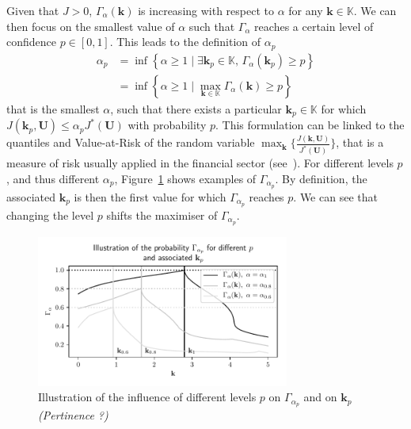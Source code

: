 \documentclass[preprint, 1p]{elsarticle}
\newcommand{\Prob}{\mathbb{P}}
\newcommand{\checkap}{{\alpha}_p}
\newcommand{\checkkp}{{\mathbf{k}}_p}
\newcommand{\Kspace}{\mathbb{K}}
\newcommand{\Uspace}{\mathbb{U}}
\newcommand{\victor}[1]{{\itshape\color{green} ({#1})}}
\begin{document}
Given that $J>0$, $\Gamma_{\alpha}(\mathbf{k})$ is increasing with respect to $\alpha$ for any $\mathbf{k}\in\Kspace$. We can then focus on the smallest value of $\alpha$ such that $\Gamma_\alpha$ reaches a certain level of confidence $p\in[0,1]$. This leads to the definition of $\checkap$
\begin{align}
  \checkap &= \inf\left\{ \alpha\geq 1 \mid \exists \checkkp \in \Kspace,\, \Gamma_{\alpha}(\checkkp) \geq p \right\} \nonumber \\
   &= \inf \left\{ \alpha \geq 1 \mid \max_{\mathbf{k}\in\Kspace} \Gamma_{\alpha}(\mathbf{k}) \geq p \right\}   \label{eq:def_alpha_check}
\end{align}
that is the smallest $\alpha$, such that there exists a particular $\checkkp \in \Kspace$ for which $J(\checkkp,\mathbf{U}) \leq \checkap J^*(\mathbf{U})$ with probability $p$. This formulation can be linked to the quantiles and Value-at-Risk of the random variable $\max_{\mathbf{k}} \{ \frac{J(\mathbf{k},\mathbf{U})}{J^*(\mathbf{U})}\}$, that is a measure of risk usually applied in the financial sector (see~\cite{rockafellar_deviation_2002}). For different levels $p$, and thus different $\alpha_p$, Figure~\ref{fig:illu_alpha_p} shows examples of $\Gamma_{\alpha_p}$. By definition, the associated $\mathbf{k}_p$ is then the first value for which $\Gamma_{\alpha_p}$ reaches $p$. We can see that changing the level $p$ shifts the maximiser of $\Gamma_{\alpha_p}$.

\begin{figure}[!ht]
\centering
\includegraphics[width = 8.3cm]{Figures/illu_alpha_p.pdf}
\caption{Illustration of the influence of different levels $p$ on $\Gamma_{\alpha_p}$ and on $\mathbf{k}_p$ \victor{Pertinence ?}}
\label{fig:illu_alpha_p}
\end{figure}



\end{document}
